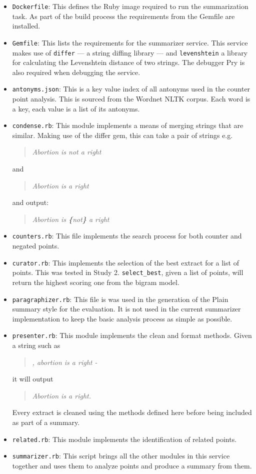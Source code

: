   \begin{itemize}
    \item
      \texttt{Dockerfile}: This defines the Ruby image required to run the summarization task. As part of the build process the requirements from the Gemfile are installed.
    \item
      \texttt{Gemfile}: This lists the requirements for the summarizer service. This service makes use of \texttt{differ} --- a string diffing library --- and \texttt{levenshtein} a library for calculating the Levenshtein distance of two strings. The debugger Pry is also required when debugging the service.
    \item
      \texttt{antonyms.json}: This is a key value index of all antonyms used in the counter point analysis. This is sourced from the Wordnet NLTK corpus. Each word is a key, each value is a list of its antonyms.
    \item
      \texttt{condense.rb}: This module implements a means of merging strings that are similar. Making use of the differ gem, this can take a pair of strings e.g. \blockquote{\textit{Abortion is not a right}} and \blockquote{\textit{Abortion is a right}} and output: \blockquote{\textit{Abortion is \textbf{\{}not\textbf{\}} a right}}.
    \item
      \texttt{counters.rb}: This file implements the search process for both counter and negated points.
    \item
      \texttt{curator.rb}: This implements the selection of the best extract for a list of points. This was tested in Study 2. \texttt{select\_best}, given a list of points, will return the highest scoring one from the bigram model.
    \item
      \texttt{paragraphizer.rb}: This file is was used in the generation of the Plain summary style for the evaluation. It is not used in the current summarizer implementation to keep the basic analysis process as simple as possible.
    \item
      \texttt{presenter.rb}: This module implements the clean and format methods. Given a string such as \blockquote{\textit{, abortion is a right - }} it will output \blockquote{\textit{Abortion is a right.}}. Every extract is cleaned using the methods defined here before being included as part of a summary.
    \item
      \texttt{related.rb}: This module implements the identification of related points.
    \item
      \texttt{summarizer.rb}: This script brings all the other modules in this service together and uses them to analyze points and produce a summary from them.

\end{itemize}
